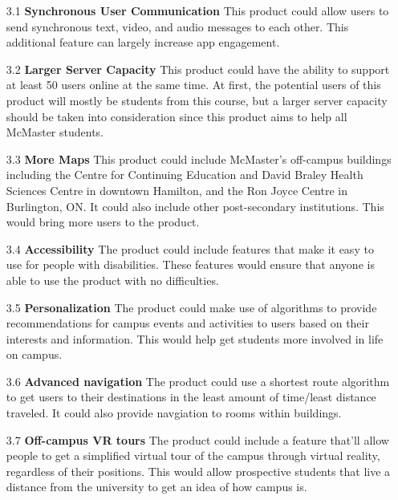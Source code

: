 \documentclass{article}
\begin{document}
\begin{itemize}
    \item[3.1] \textbf{Synchronous User Communication} This product could allow users to send synchronous text, video, and audio messages to each other. This additional feature can largely increase app engagement.

    \item[3.2] \textbf{Larger Server Capacity} This product could have the ability to support at least 50 users online at the same time. At first, the potential users of this product will mostly be students from this course, but a larger server capacity should be taken into consideration since this product aims to help all McMaster students.

    \item[3.3] \textbf{More Maps} This product could include McMaster's off-campus buildings including the Centre for Continuing Education and David Braley Health Sciences Centre in downtown Hamilton, and the Ron Joyce Centre in Burlington, ON. It could also include other post-secondary institutions. This would bring more users to the product.

    \item[3.4] \textbf{Accessibility} The product could include features that make it easy to use for people with disabilities. These features would ensure that anyone is able to use the product with no difficulties.
    
    \item[3.5] \textbf{Personalization} The product could make use of algorithms to provide recommendations for campus events and activities to users based on their interests and information. This would help get students more involved in life on campus.

    \item[3.6] \textbf{Advanced navigation} The product could use a shortest route algorithm to get users to their destinations in the least amount of time/least distance traveled. It could also provide navgiation to rooms within buildings.

    \item[3.7] \textbf{Off-campus VR tours} The product could include a feature that'll allow people to get a simplified virtual tour of the campus through virtual reality, regardless of their positions. This would allow prospective students that live a distance from the university to get an idea of how campus is.
\end{itemize}
\end{document}
